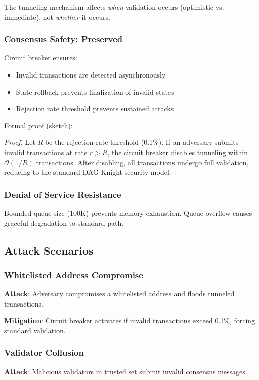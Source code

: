 \documentclass[11pt,a4paper]{article}
\begin{document}
The tunneling mechanism affects \emph{when} validation occurs (optimistic vs. immediate), not \emph{whether} it occurs.

\subsubsection{Consensus Safety: Preserved}
Circuit breaker ensures:
\begin{itemize}
    \item Invalid transactions are detected asynchronously
    \item State rollback prevents finalization of invalid states
    \item Rejection rate threshold prevents sustained attacks
\end{itemize}

Formal proof (sketch):
\begin{proof}
Let $R$ be the rejection rate threshold (0.1\%). If an adversary submits invalid transactions at rate $r > R$, the circuit breaker disables tunneling within $\mathcal{O}(1/R)$ transactions. After disabling, all transactions undergo full validation, reducing to the standard DAG-Knight security model.
\end{proof}

\subsubsection{Denial of Service Resistance}
Bounded queue size (100K) prevents memory exhaustion. Queue overflow causes graceful degradation to standard path.

\subsection{Attack Scenarios}

\subsubsection{Whitelisted Address Compromise}
\textbf{Attack}: Adversary compromises a whitelisted address and floods tunneled transactions.

\textbf{Mitigation}: Circuit breaker activates if invalid transactions exceed 0.1\%, forcing standard validation.

\subsubsection{Validator Collusion}
\textbf{Attack}: Malicious validators in trusted set submit invalid consensus messages.
\end{document}
